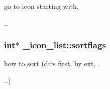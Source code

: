 go to icon starting with. 

.. \hypertarget{struct__icon__list_o33}{
\subsubsection[sortflags]{\setlength{\rightskip}{0pt plus 5cm}int$\ast$ \hyperlink{struct__icon__list_o33}{\_\-icon\_\-list::sortflags}}}
\label{struct__icon__list_o33}


how to sort (dirs first, by ext, . 

..) 